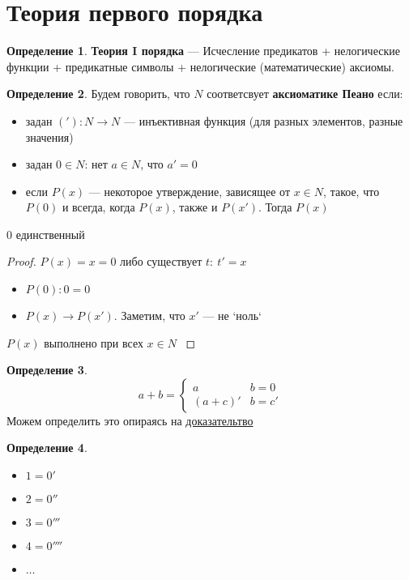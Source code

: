 \documentclass[oneside]{book}
\newcounter{propertycnt}
\newcommand{\beginproperty}{\setcounter{propertycnt}{1}}
\theoremstyle{plain}
\newenvironment{property}{
  \renewcommand\thepropertyinner{\arabic{propertycnt}}
  \propertyinner
}{\endpropertyinner\stepcounter{propertycnt}}
\theoremstyle{remark}
\theoremstyle{definition}
\newtheorem*{definition}{Определение}
\begin{document}
\section{Теория первого порядка}
\label{sec:org504aa19}
\begin{definition}
\textbf{Теория I порядка} --- Исчесление предикатов + нелогические функции + предикатные символы + нелогические (математические) аксиомы.
\end{definition}
\begin{definition}
Будем говорить, что \(N\) соответсвует \textbf{аксиоматике Пеано} если:
\begin{itemize}
\item задан \(('): N \to N\) --- инъективная функция (для разных элементов, разные значения)
\item задан \(0 \in N\): нет \(a \in N\), что \(a' = 0\)
\item если \(P(x)\) --- некоторое утверждение, зависящее от \(x \in N\), такое, что \(P(0)\) и всегда, когда \(P(x)\), также и \(P(x')\). Тогда \(P(x)\)
\end{itemize}
\end{definition}
\beginproperty
\begin{property}
\(0\) единственный
\label{orgf0f2504}
\end{property}
\begin{proof}
\(P(x)=x = 0\) либо существует \(t:\ t' = x\)
\begin{itemize}
\item \(P(0): 0 = 0\)
\item \(P(x) \to P(x')\). Заметим, что \(x'\) --- не `ноль`
\end{itemize}
\(P(x)\) выполнено при всех \(x \in N\)
\label{org428f7c5}
\end{proof}
\begin{definition}
\[ a + b = \begin{cases}
a & b = 0 \\
(a + c)' & b = c'
\end{cases}\]
Можем определить это опираясь на \hyperref[org428f7c5]{доказательтво}
\end{definition}
\begin{definition}
\begin{itemize}
\item \(1 = 0'\)
\item \(2 = 0''\)
\item \(3 = 0'''\)
\item \(4 = 0''''\)
\item \(\dots\)
\end{itemize}
\end{definition}
\end{document}
